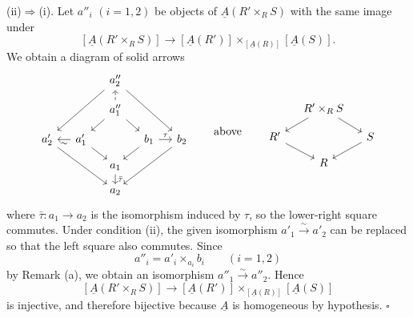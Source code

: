(ii)$\Rightarrow$(i). Let $a''_i$ $(i=1,2)$ be objects of
$\underline A(R'\times_RS)$ with the same image under
\[
 [\underline A(R'\times_RS)]\longrightarrow
 [\underline A(R')]
 \times_{[\underline A(R)]}[\underline A(S)].
\]
We obtain a diagram of solid arrows
\[
\begin{tikzcd}[column sep=small,row sep=small]
 && a''_2 \arrow[ddll] \arrow[ddrr] &&\\
 && a''_1 \arrow[u,dashed] \arrow[dl] \arrow[dr] &&\\
 a'_2 \arrow[ddrr] & a'_1 \arrow[l,"{\sim}"] \arrow[dr]
 && b_1 \arrow[r,"{\tau}"] \arrow[dl] & b_2 \arrow[ddll]\\
 && a_1 \arrow[d,"{\bar\tau}"] &&\\
 && a_2 &&
\end{tikzcd}
\qquad\text{above}\qquad
\begin{tikzcd}[column sep=small,row sep=small]
 & R'\times_RS \arrow[dl] \arrow[dr] &\\
 R' \arrow[dr] && S \arrow[dl]\\
 & R &
\end{tikzcd}
\]
where $\bar\tau:a_1\longrightarrow a_2$ is the isomorphism induced
by $\tau$, so the lower-right square commutes. Under condition (ii),
the given isomorphism $a'_1\xrightarrow{\sim}a'_2$ can be replaced
so that the left square also commutes. Since
\[
 a''_i=a'_i\times_{a_i}b_i\qquad(i=1,2)
\]
by Remark (a), we obtain an isomorphism
$a''_1\xrightarrow{\sim}a''_2$. Hence
\[
 [\underline A(R'\times_RS)]\longrightarrow
 [\underline A(R')]
 \times_{[\underline A(R)]}[\underline A(S)]
\]
is injective, and therefore bijective because $\underline A$ is
homogeneous by hypothesis. \hfill$\square$

